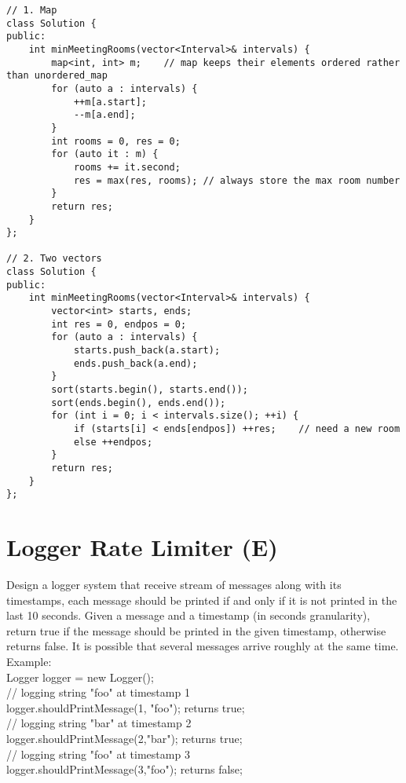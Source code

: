 \begin{lstlisting}
// 1. Map
class Solution {
public:
    int minMeetingRooms(vector<Interval>& intervals) {
        map<int, int> m;    // map keeps their elements ordered rather than unordered_map
        for (auto a : intervals) {
            ++m[a.start];
            --m[a.end];
        }
        int rooms = 0, res = 0;
        for (auto it : m) {
            rooms += it.second;
            res = max(res, rooms); // always store the max room number
        }
        return res;
    }
};

// 2. Two vectors
class Solution {
public:
    int minMeetingRooms(vector<Interval>& intervals) {
        vector<int> starts, ends;
        int res = 0, endpos = 0;
        for (auto a : intervals) {
            starts.push_back(a.start);
            ends.push_back(a.end);
        }
        sort(starts.begin(), starts.end());
        sort(ends.begin(), ends.end());
        for (int i = 0; i < intervals.size(); ++i) {
            if (starts[i] < ends[endpos]) ++res;    // need a new room
            else ++endpos;
        }
        return res;
    }
};
\end{lstlisting}


\section{Logger Rate Limiter (E)}
Design a logger system that receive stream of messages along with its timestamps, each message should be printed if and only if it is not printed in the last 10 seconds. Given a message and a timestamp (in seconds granularity), return true if the message should be printed in the given timestamp, otherwise returns false. It is possible that several messages arrive roughly at the same time.\\

Example:\\
Logger logger = new Logger();\\

// logging string "foo" at timestamp 1\\
logger.shouldPrintMessage(1, "foo"); returns true;\\

// logging string "bar" at timestamp 2\\
logger.shouldPrintMessage(2,"bar"); returns true;\\

// logging string "foo" at timestamp 3\\
logger.shouldPrintMessage(3,"foo"); returns false;\\

